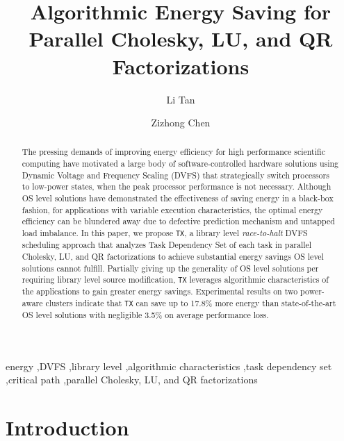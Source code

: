 \documentclass[12pt]{elsarticle}
\begin{document}
\begin{frontmatter}





\title{Algorithmic Energy Saving for Parallel Cholesky, LU, and QR Factorizations}



\author{Li Tan}\author{Zizhong Chen}
\address{Department of Computer Science and Engineering, University of California, Riverside, CA, USA}

\begin{abstract}
The pressing demands of improving energy efficiency for high performance scientific computing have motivated a large body of software-controlled hardware solutions using Dynamic Voltage and Frequency Scaling (DVFS) that strategically switch processors to low-power states, when the peak processor performance is not necessary. Although OS level solutions have demonstrated the effectiveness of saving energy in a black-box fashion, for applications with variable execution characteristics, the optimal energy efficiency can be blundered away due to defective prediction mechanism and untapped load imbalance. In this paper, we propose \texttt{TX}, a library level \emph{race-to-halt} DVFS scheduling approach that analyzes Task Dependency Set of each task in parallel Cholesky, LU, and QR factorizations to achieve substantial energy savings OS level solutions cannot fulfill. Partially giving up the generality of OS level solutions per requiring library level source modification, \texttt{TX} leverages algorithmic characteristics of the applications to gain greater energy savings. Experimental results on two power-aware clusters indicate that \texttt{TX} can save up to 17.8\% more energy than state-of-the-art OS level solutions with negligible 3.5\% on average performance loss.\end{abstract}

\begin{keyword}
energy \sep DVFS \sep library level \sep algorithmic characteristics \sep task dependency set \sep critical path \sep parallel Cholesky, LU, and QR factorizations
\end{keyword}

\end{frontmatter}



\section{Introduction}
\end{document}
